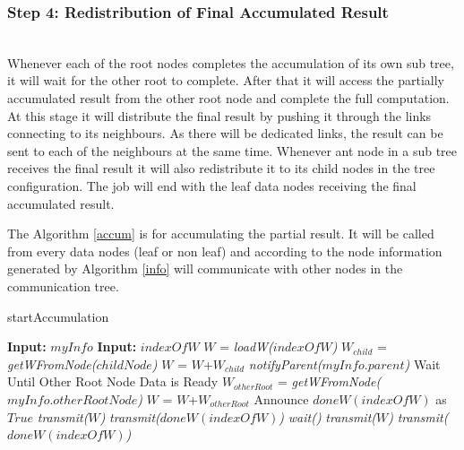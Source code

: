 \documentclass[10pt,conference,letterpaper]{IEEEtran}
\begin{document}
\subsubsection{\textbf{Step 4: Redistribution of Final Accumulated Result}}\hspace*{\fill} \\
Whenever each of the root nodes completes the accumulation of its own sub tree, it will wait for the other root to complete. After that it will access the partially accumulated result from the other root node and complete the full computation. At this stage it will distribute the final result by pushing it through the links connecting to its neighbours. As there will be dedicated links, the result can be sent to each of the neighbours at the same time. Whenever ant node in a sub tree receives the final result it will also redistribute it to its child nodes in the tree configuration. The job will end with the leaf data nodes receiving the final accumulated result.

The Algorithm \ref{accum} is for accumulating the partial result. It will be called from every data nodes (leaf or non leaf) and according to the node information generated by Algorithm \ref{info} will communicate with other nodes in the communication tree.

\begin{algorithm} [!htbp]
\label{accum}
\caption{startAccumulation}
	\begin{algorithmic}[1]
	\State \textbf{Input:} $myInfo$
	\State \textbf{Input:} $indexOfW$
	\State $W$ = \textit{loadW($indexOfW$)} 
			\State  $W_{child}$ = \textit{getWFromNode($childNode$)}
			\State $W$ = $W$+$W_{child}$
		\EndIf
	\EndFor
	\State \textit{notifyParent($myInfo.parent$)}
		\State Wait Until Other Root Node Data is Ready
		\State  $W_{otherRoot}$ = \textit{getWFromNode($myInfo.otherRootNode$)}
		\State $W$ = $W$+$W_{otherRoot}$
		\State Announce $doneW(indexOfW)$ as $True$
			\State \textit{transmit($W$)}
			\State \textit{transmit($doneW(indexOfW)$)}
		\EndFor
	\Else
			\State \textit{wait()}
		\EndWhile
			\State \textit{transmit($W$)}
			\State \textit{transmit($doneW(indexOfW)$)}
		\EndFor
	\EndIf
	
	\end{algorithmic}
\end{algorithm}
\end{document}
